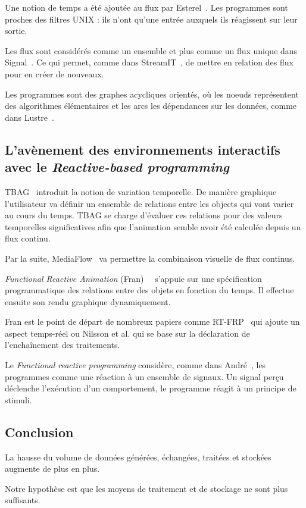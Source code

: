 \documentclass{llncs}
\newcommand{\RP}{\emph{Reactive-based programming} }
\newcommand{\FRP}{\emph{Functional reactive programming} }
\begin{document}
Une notion de temps a été ajoutée au flux par Esterel~\cite{Berry84}.
Les programmes sont proches des filtres UNIX : ils n'ont qu'une entrée auxquels
ils réagissent sur leur sortie.

Les flux sont considérés comme un ensemble et plus comme un flux unique dans Signal~\cite{Benveniste85}.
Ce qui permet, comme dans StreamIT~\cite{Thies02}, de mettre en relation des flux
pour en créer de nouveaux.

Les programmes sont des graphes acycliques orientés, où les noeuds représentent des
algorithmes élémentaires et les arcs les dépendances sur les données, comme dans
Lustre~\cite{Caspi87}.

\subsection{L'avènement des environnements interactifs avec le \RP}
TBAG~\cite{Elliott94} introduit la notion de variation temporelle.
De manière graphique l'utilisateur va définir un ensemble de relations
entre les objects qui vont varier au cours du temps.
TBAG se charge d'évaluer ces relations pour des valeurs temporelles
significatives afin que l'animation semble avoir été calculée depuis
un flux continu.

Par la suite, MediaFlow~\cite{Elliott95} va permettre la combinaison visuelle
de flux continus.

\emph{Functional Reactive Animation} (Fran)~\cite{Elliott97}~\cite{Elliott98}
s'appuie sur une spécification programmatique des relations entre des objets
en fonction du temps.
Il effectue ensuite son rendu graphique dynamiquement.

Fran est le point de départ de nombreux papiers comme RT-FRP~\cite{Wan02}
qui ajoute un aspect temps-réel ou Nilsson et al.\cite{Nilsson2002a} qui se base
sur la déclaration de l'enchaînement des traitements.

Le \FRP considère, comme dans André~\cite{Andre96}, les programmes comme
une réaction à un ensemble de signaux. Un signal perçu déclenche l'exécution
d'un comportement, le programme réagit à un principe de stimuli.

\subsection{Conclusion}
La hausse du volume de données générées, échangées, traitées et stockées augmente de
plus en plus.

Notre hypothèse est que les moyens de traitement et de stockage ne sont plus
suffisants.
\end{document}
